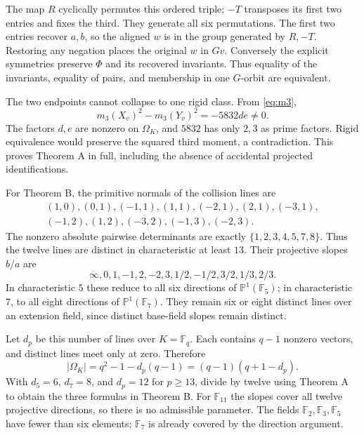 \documentclass[11pt]{article}
\newcommand{\F}{\mathbb F}
\newcommand{\Om}{\Omega_K}
\begin{document}
The map $R$ cyclically permutes this ordered triple; $-T$ transposes
its first two entries and fixes the third. They generate all six
permutations. The first two entries recover $a,b$, so the aligned $w$
is in the group generated by $R,-T$. Restoring any negation places the
original $w$ in $Gv$. Conversely the explicit symmetries preserve $\Phi$
and its recovered invariants. Thus equality of the invariants, equality
of pairs, and membership in one $G$-orbit are equivalent.

The two endpoints cannot collapse to one rigid class. From \eqref{eq:m3},
\[
 m_3(X_v)^2-m_3(Y_v)^2=-5832de\ne0.
\]
The factors $d,e$ are nonzero on $\Om$, and $5832$ has only $2,3$
as prime factors. Rigid equivalence would preserve the squared third
moment, a contradiction. This proves Theorem A in full, including the
absence of accidental projected identifications.

For Theorem B, the primitive normals of the collision lines are
\begin{gather*}
 (1,0),(0,1),(-1,1),(1,1),(-2,1),(2,1),(-3,1),\\
 (-1,2),(1,2),(-3,2),(-1,3),(-2,3).
\end{gather*}
The nonzero absolute pairwise determinants are exactly
$\{1,2,3,4,5,7,8\}$. Thus the twelve lines are distinct in
characteristic at least $13$. Their projective slopes $b/a$ are
\[
 \infty,0,1,-1,2,-2,3,1/2,-1/2,3/2,1/3,2/3.
\]
In characteristic $5$ these reduce to all six directions of
$\mathbb P^1(\F_5)$; in characteristic $7$, to all eight directions of
$\mathbb P^1(\F_7)$. They remain six or eight distinct lines over
an extension field, since distinct base-field slopes remain distinct.

Let $d_p$ be this number of lines over $K=\F_q$. Each contains $q-1$
nonzero vectors, and distinct lines meet only at zero. Therefore
\[
 |\Om|=q^2-1-d_p(q-1)=(q-1)(q+1-d_p).
\]
With $d_5=6$, $d_7=8$, and $d_p=12$ for $p\ge13$, divide by twelve
using Theorem A to obtain the three formulas in Theorem B. For
$\F_{11}$ the slopes cover all twelve projective directions, so there
is no admissible parameter. The fields $\F_2,\F_3,\F_5$ have fewer
than six elements; $\F_7$ is already covered by the direction argument.

\newpage
\end{document}
